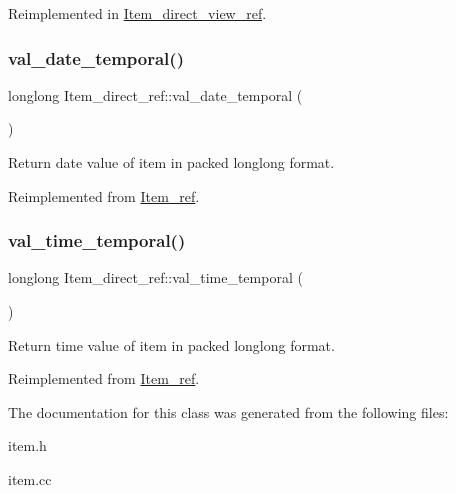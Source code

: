Reimplemented in \mbox{\hyperlink{classItem__direct__view__ref_addadee858f933ad08e2bb3bb533067f3}{Item\+\_\+direct\+\_\+view\+\_\+ref}}.

\mbox{\label{classItem__direct__ref_a10fdb82072009fd9bc88657cbc49f282}} 
\subsubsection{\texorpdfstring{val\+\_\+date\+\_\+temporal()}{val\_date\_temporal()}}
{\footnotesize\ttfamily longlong Item\+\_\+direct\+\_\+ref\+::val\+\_\+date\+\_\+temporal (\begin{DoxyParamCaption}{ }\end{DoxyParamCaption})\hspace{0.3cm}{\ttfamily [virtual]}}

Return date value of item in packed longlong format. 

Reimplemented from \mbox{\hyperlink{classItem__ref_a749f7427b60d23f3f50a6651dcc3abf6}{Item\+\_\+ref}}.

\mbox{\label{classItem__direct__ref_af46d56da55778711183208f74fc592e9}} 
\subsubsection{\texorpdfstring{val\+\_\+time\+\_\+temporal()}{val\_time\_temporal()}}
{\footnotesize\ttfamily longlong Item\+\_\+direct\+\_\+ref\+::val\+\_\+time\+\_\+temporal (\begin{DoxyParamCaption}{ }\end{DoxyParamCaption})\hspace{0.3cm}{\ttfamily [virtual]}}

Return time value of item in packed longlong format. 

Reimplemented from \mbox{\hyperlink{classItem__ref_a962c929d6871099e06c7aa2868f09779}{Item\+\_\+ref}}.



The documentation for this class was generated from the following files\+:\begin{DoxyCompactItemize}
\item 
item.\+h\item 
item.\+cc\end{DoxyCompactItemize}
